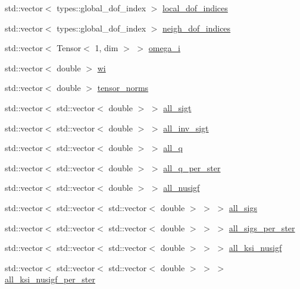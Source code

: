 \begin{DoxyCompactItemize}
\item 
std\+::vector$<$ types\+::global\+\_\+dof\+\_\+index $>$ \hyperlink{class_equation_base_a63c4e27465bea3cf4c2348ea7f4782c8}{local\+\_\+dof\+\_\+indices}
\item 
std\+::vector$<$ types\+::global\+\_\+dof\+\_\+index $>$ \hyperlink{class_equation_base_a94114d6debfbf1955c3c39f5330ac3c2}{neigh\+\_\+dof\+\_\+indices}
\item 
std\+::vector$<$ Tensor$<$ 1, dim $>$ $>$ \hyperlink{class_equation_base_a46320b14358dd65c8450bba919c856d0}{omega\+\_\+i}
\item 
std\+::vector$<$ double $>$ \hyperlink{class_equation_base_a46388ad4bea156033fa98fd8f484a068}{wi}
\item 
std\+::vector$<$ double $>$ \hyperlink{class_equation_base_a2e5e8e486a1e6994c606dc05227752dd}{tensor\+\_\+norms}
\item 
std\+::vector$<$ std\+::vector$<$ double $>$ $>$ \hyperlink{class_equation_base_a818488c38892b44ccf25eb6f61e89ecc}{all\+\_\+sigt}
\item 
std\+::vector$<$ std\+::vector$<$ double $>$ $>$ \hyperlink{class_equation_base_aedead29f1c4bb6b9f7b17b1fe1441c5f}{all\+\_\+inv\+\_\+sigt}
\item 
std\+::vector$<$ std\+::vector$<$ double $>$ $>$ \hyperlink{class_equation_base_add5be1036bc07500adc0d925020798a6}{all\+\_\+q}
\item 
std\+::vector$<$ std\+::vector$<$ double $>$ $>$ \hyperlink{class_equation_base_a6a633374c56fe767325b5c0860269fbf}{all\+\_\+q\+\_\+per\+\_\+ster}
\item 
std\+::vector$<$ std\+::vector$<$ double $>$ $>$ \hyperlink{class_equation_base_a8c88d4b3e532cb639cea6e653dee5cfc}{all\+\_\+nusigf}
\item 
std\+::vector$<$ std\+::vector$<$ std\+::vector$<$ double $>$ $>$ $>$ \hyperlink{class_equation_base_a6775388f6b8dcd903a0f95443b2e8c0d}{all\+\_\+sigs}
\item 
std\+::vector$<$ std\+::vector$<$ std\+::vector$<$ double $>$ $>$ $>$ \hyperlink{class_equation_base_abf2c1a575944b0661bb48e2380c269a0}{all\+\_\+sigs\+\_\+per\+\_\+ster}
\item 
std\+::vector$<$ std\+::vector$<$ std\+::vector$<$ double $>$ $>$ $>$ \hyperlink{class_equation_base_a6dd0c8e99876686f8b6310dd3c914966}{all\+\_\+ksi\+\_\+nusigf}
\item 
std\+::vector$<$ std\+::vector$<$ std\+::vector$<$ double $>$ $>$ $>$ \hyperlink{class_equation_base_aa9d38817ca8b3d8c5bc577c7010473d0}{all\+\_\+ksi\+\_\+nusigf\+\_\+per\+\_\+ster}

\end{DoxyCompactItemize}
